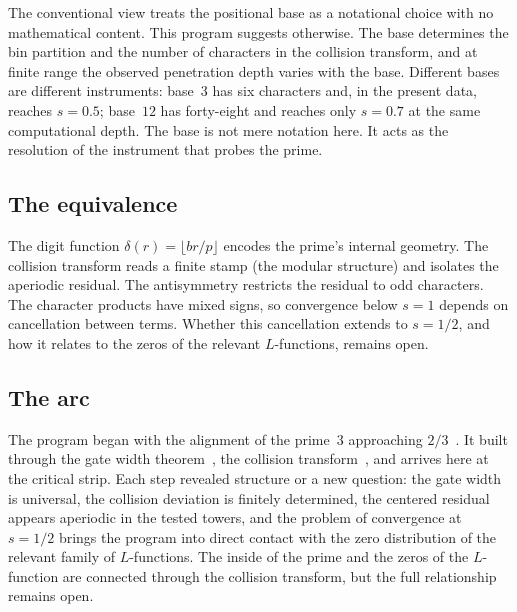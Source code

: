 \documentclass[12pt]{amsart}
\theoremstyle{definition}
\theoremstyle{remark}
\begin{document}
The conventional view treats the positional base as a
notational choice with no mathematical content. This
program suggests otherwise. The base determines the bin
partition and the number of characters in the collision
transform, and at finite range the observed penetration
depth varies with the base. Different bases are different
instruments: base~$3$
has six characters and, in the present data, reaches
$s = 0.5$; base~$12$ has forty-eight and reaches only
$s = 0.7$ at the same computational depth. The base is
not mere notation here. It acts as the resolution of the
instrument that probes the prime.

\subsection*{The equivalence}

The digit function $\delta(r) = \lfloor br/p \rfloor$
encodes the prime's internal geometry. The collision
transform reads a finite stamp (the modular structure)
and isolates the aperiodic residual. The antisymmetry
restricts the residual to odd characters. The character
products have mixed signs, so convergence below $s = 1$
depends on cancellation between terms. Whether this
cancellation extends to $s = 1/2$, and how it relates
to the zeros of the relevant $L$-functions, remains open.

\subsection*{The arc}

The program began with the alignment of the prime~$3$
approaching $2/3$~\cite{paper1}. It built through the gate
width theorem~\cite{paper11}, the collision
transform~\cite{paper16}, and arrives here at the critical
strip.
Each step revealed structure or a new question: the gate
width is universal, the collision deviation is finitely
determined, the centered residual appears aperiodic in the
tested towers, and the problem of convergence at
$s = 1/2$ brings the program into direct contact with the
zero distribution of the relevant family of $L$-functions.
The inside of the prime and the zeros of the $L$-function
are connected through the collision transform, but the full
relationship remains open.
\end{document}
